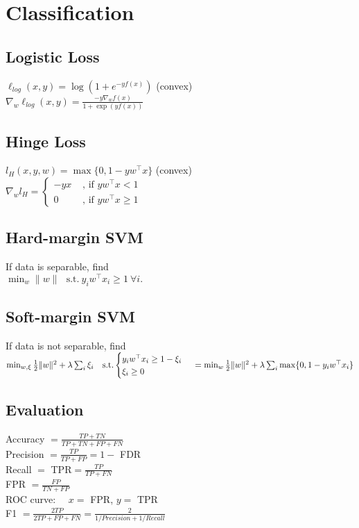\section*{Classification}
\subsection*{Logistic Loss}
$\ell_{log}(x,y) = \log(1+e^{-yf(x)})$ (convex)\\
$\nabla_w \ell_{log}(x,y) = \frac{-y\nabla_w f(x)}{1+\exp(yf(x))} $

\subsection*{Hinge Loss}
$l_H(x,y,w) = \max \{0,1-y w^\top x\}$ (convex)\\
$\nabla_w l_H = \begin{cases}
    -y x&\text{ , if $yw^\top x<1$}\\
	0 &\text{ , if $y w^\top x \geq 1$}
\end{cases}$

\subsection*{Hard-margin SVM}
If data is separable, find \\
$\min_w\|w\| \ \ \ \text{s.t.} \ y_iw^\top x_i\geq 1 \ \forall i.$\\

\subsection*{Soft-margin SVM}
If data is not separable, find \\
$\min_{w,\xi}\frac{1}{2}\|w\|^2  +\lambda\sum_i\xi_i\ \ \ 
\text{s.t.} \begin{cases}
    y_iw^\top x_i\geq 1-\xi_i\\
    \xi_i\geq0
\end{cases}\\
=\min_w\frac{1}{2}\|w\|^2+\lambda\sum_i\max \{0,1-y_i w^\top x_i\}$


\subsection*{Evaluation}
Accuracy $=\frac{TP+TN}{TP+TN+FP+FN}$\\
Precision $=\frac{TP}{TP+FP}= 1-$ FDR\\
Recall $=$ TPR$ =\frac{TP}{TP+FN}$\\
FPR $=\frac{FP}{TN+FP}$\\
ROC curve: \ \ $x=$ FPR, $y=$ TPR\\
F1 $=\frac{2TP}{2TP+FP+FN}=\frac{2}{1/Precision+1/Recall}$\\